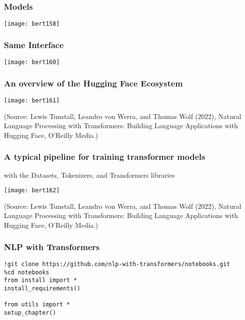 \begin{frame}[fragile]\frametitle{Models}
			\begin{center}
			\texttt{[image: bert158]}
			\end{center}	
\end{frame}

\begin{frame}[fragile]\frametitle{Same Interface}
			\begin{center}
			\texttt{[image: bert160]}
			\end{center}	
\end{frame}

\begin{frame}[fragile]\frametitle{An overview of the Hugging Face Ecosystem}
			\begin{center}
			\texttt{[image: bert161]}
			\end{center}	
			
			{\tiny (Source: Lewis Tunstall, Leandro von Werra, and Thomas Wolf (2022), Natural Language Processing with Transformers:  Building Language Applications with Hugging Face,  O'Reilly Media.)}
\end{frame}

\begin{frame}[fragile]\frametitle{A typical pipeline for training transformer models }

with the  Datasets,  Tokenizers, and  Transformers libraries

			\begin{center}
			\texttt{[image: bert162]}
			\end{center}	
			
			{\tiny (Source: Lewis Tunstall, Leandro von Werra, and Thomas Wolf (2022), Natural Language Processing with Transformers:  Building Language Applications with Hugging Face,  O'Reilly Media.)}
\end{frame}

\begin{frame}[fragile]\frametitle{NLP with Transformers}

\begin{lstlisting}
!git clone https://github.com/nlp-with-transformers/notebooks.git
%cd notebooks
from install import *
install_requirements()

from utils import *
setup_chapter()
\end{lstlisting}
			
\end{frame}

